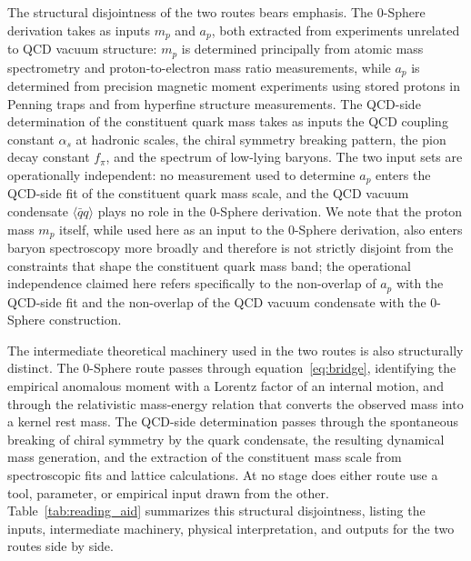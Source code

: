 \documentclass[%
 reprint, amsmath,amssymb, aps, prc, ]{revtex4-2}
\numberwithin{equation}{section}
\begin{document}
The structural disjointness of the two routes bears emphasis.
The 0-Sphere derivation takes as inputs $m_p$ and $a_p$, both extracted from experiments unrelated to QCD vacuum structure: $m_p$ is determined principally from atomic mass spectrometry and proton-to-electron mass ratio measurements, while $a_p$ is determined from precision magnetic moment experiments using stored protons in Penning traps and from hyperfine structure measurements.
The QCD-side determination of the constituent quark mass takes as inputs the QCD coupling constant $\alpha_s$ at hadronic scales, the chiral symmetry breaking pattern, the pion decay constant $f_\pi$, and the spectrum of low-lying baryons.
The two input sets are operationally independent: no measurement used to determine $a_p$ enters the QCD-side fit of the constituent quark mass scale, and the QCD vacuum condensate $\langle\bar{q}q\rangle$ plays no role in the 0-Sphere derivation. We note that the proton mass $m_p$ itself, while used here as an input to the 0-Sphere derivation, also enters baryon spectroscopy more broadly and therefore is not strictly disjoint from the constraints that shape the constituent quark mass band; the operational independence claimed here refers specifically to the non-overlap of $a_p$ with the QCD-side fit and the non-overlap of the QCD vacuum condensate with the 0-Sphere construction.

The intermediate theoretical machinery used in the two routes is also structurally distinct.
The 0-Sphere route passes through equation~\eqref{eq:bridge}, identifying the empirical anomalous moment with a Lorentz factor of an internal motion, and through the relativistic mass-energy relation that converts the observed mass into a kernel rest mass.
The QCD-side determination passes through the spontaneous breaking of chiral symmetry by the quark condensate, the resulting dynamical mass generation, and the extraction of the constituent mass scale from spectroscopic fits and lattice calculations.
At no stage does either route use a tool, parameter, or empirical input drawn from the other.
Table~\ref{tab:reading_aid} summarizes this structural disjointness, listing the inputs, intermediate machinery, physical interpretation, and outputs for the two routes side by side.
\end{document}
